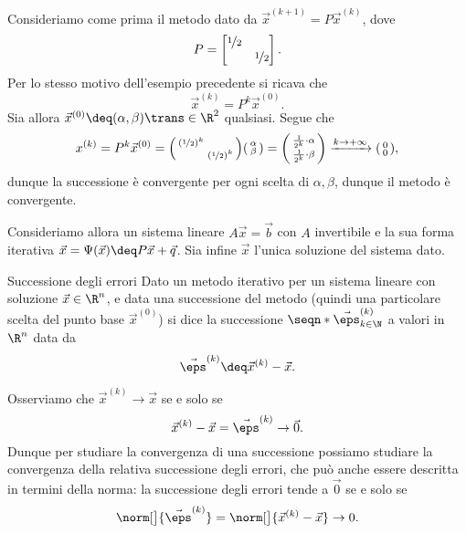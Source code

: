 \begin{example}
    Consideriamo come prima il metodo dato da $\vec x^{(k+1)} = P\vec x^{(k)}$, dove \[
        P = \begin{bmatrix}
            \nicefrac12 & \\
            & \nicefrac12
        \end{bmatrix}.
    \] Per lo stesso motivo dell'esempio precedente si ricava che \[
        \vec x^{(k)} = P^k\vec x^{(0)}.
    \] Sia allora $\vec x^{(0)} \deq (\alpha, \beta)\trans \in \R^2$ qualsiasi. Segue che \[
        x^{(k)} = P^k\vec x^{(0)} = \begin{psmallmatrix}
            (\nicefrac12)^k & \\
            & (\nicefrac12)^k
        \end{psmallmatrix}\begin{psmallmatrix}
            \alpha \\ \beta
        \end{psmallmatrix} = \begin{psmallmatrix}
            \frac{1}{2^k}\cdot \alpha \\
            \frac{1}{2^k}\cdot \beta
        \end{psmallmatrix} \xrightarrow{k \to +\infty} \begin{psmallmatrix}
            0 \\ 0
        \end{psmallmatrix},
    \] dunque la successione è convergente per ogni scelta di $\alpha, \beta$, dunque il metodo è convergente. 
\end{example}

Consideriamo allora un sistema lineare $A\vec x = \vec b$ con $A$ invertibile e la sua forma iterativa $\vec x = \Psi(\vec x) \deq P\vec x + \vec q$. Sia infine $\vec x$ l'unica soluzione del sistema dato.

\begin{definition}
    {Successione degli errori}{}
    Dato un metodo iterativo per un sistema lineare con soluzione $\vec x \in \R^n$, e data una successione del metodo (quindi una particolare scelta del punto base $\vec x^{(0)}$) si dice  la successione $\seqn*{\vec \eps^{(k)}}_{k \in \N}$ a valori in $\R^n$ data da \[
        \vec \eps^{(k)} \deq \vec x^{(k)} - \vec x.
    \]
\end{definition}

Osserviamo che $\vec x^{(k)} \to \vec x$ se e solo se \[
    \vec x^{(k)} - \vec x = \vec \eps^{(k)} \to \vec 0.
\] Dunque per studiare la convergenza di una successione possiamo studiare la convergenza della relativa successione degli errori, che può anche essere descritta in termini della norma: la successione degli errori tende a $\vec 0$ se e solo se \[
    \norm[\big]{\vec \eps^{(k)}} = \norm[\big]{\vec x^{(k)} - \vec x} \to 0.
\]

